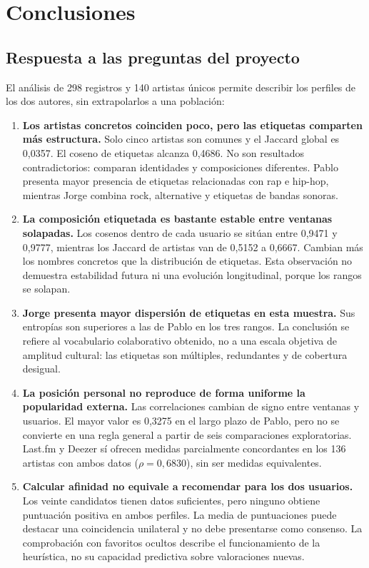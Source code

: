 \chapter{Conclusiones}
\label{chap:conclusiones}

\section{Respuesta a las preguntas del proyecto}
\label{sec:conclusiones-analisis}

El análisis de 298 registros y 140 artistas únicos permite describir los perfiles de los dos autores, sin extrapolarlos a una población:

\begin{enumerate}
    \item \textbf{Los artistas concretos coinciden poco, pero las etiquetas comparten más estructura.} Solo cinco artistas son comunes y el Jaccard global es 0,0357. El coseno de etiquetas alcanza 0,4686. No son resultados contradictorios: comparan identidades y composiciones diferentes. Pablo presenta mayor presencia de etiquetas relacionadas con rap e hip-hop, mientras Jorge combina rock, alternative y etiquetas de bandas sonoras.
    \item \textbf{La composición etiquetada es bastante estable entre ventanas solapadas.} Los cosenos dentro de cada usuario se sitúan entre 0,9471 y 0,9777, mientras los Jaccard de artistas van de 0,5152 a 0,6667. Cambian más los nombres concretos que la distribución de etiquetas. Esta observación no demuestra estabilidad futura ni una evolución longitudinal, porque los rangos se solapan.
    \item \textbf{Jorge presenta mayor dispersión de etiquetas en esta muestra.} Sus entropías son superiores a las de Pablo en los tres rangos. La conclusión se refiere al vocabulario colaborativo obtenido, no a una escala objetiva de amplitud cultural: las etiquetas son múltiples, redundantes y de cobertura desigual.
    \item \textbf{La posición personal no reproduce de forma uniforme la popularidad externa.} Las correlaciones cambian de signo entre ventanas y usuarios. El mayor valor es 0,3275 en el largo plazo de Pablo, pero no se convierte en una regla general a partir de seis comparaciones exploratorias. Last.fm y Deezer sí ofrecen medidas parcialmente concordantes en los 136 artistas con ambos datos ($\rho=0{,}6830$), sin ser medidas equivalentes.
    \item \textbf{Calcular afinidad no equivale a recomendar para los dos usuarios.} Los veinte candidatos tienen datos suficientes, pero ninguno obtiene puntuación positiva en ambos perfiles. La media de puntuaciones puede destacar una coincidencia unilateral y no debe presentarse como consenso. La comprobación con favoritos ocultos describe el funcionamiento de la heurística, no su capacidad predictiva sobre valoraciones nuevas.

\end{enumerate}
